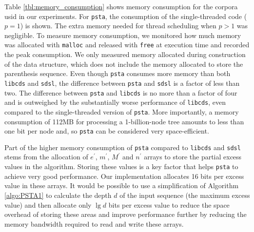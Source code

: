 Table \ref{tbl:memory_consumption} shows memory consumption for the
corpora usid in our experiments.
For {\tt psta}, the consumption of the single-threaded code ($p = 1$)
is shown.
The extra memory needed for thread scheduling when $p > 1$ was negligible.
To measure memory consumption, we
monitored how much memory was allocated with \texttt{malloc} and
released with \texttt{free} at execution time and recorded the peak
consumption.
We only measured memory allocated during construction of the data structure,
which does not include  the memory allocated to store the parenthesis sequence.
Even though {\tt psta} consumes more memory than both {\tt libcds} and
{\tt sdsl}, the difference between {\tt psta} and {\tt sdsl} is a factor of
less than two.
The difference between {\tt psta} and {\tt libcds} is no more than a factor of
four and is outweighed by the substantially worse performance of {\tt libcds},
even compared to the single-threaded version of {\tt psta}.
More importantly, a memory consumption of 112MB for processing a 1-billion-node
tree amounts to less than one bit per node and, so {\tt psta} can be considered
very space-efficient.


Part of the higher memory consumption of {\tt psta} compared to {\tt libcds}
and {\tt sdsl} stems from the allocation of
$e^{\prime}$, $m^{\prime}$, $M^{\prime}$ and $n^{\prime}$ arrays to store the
partial excess values in the algorithm.
Storing these values is a key factor that helps {\tt psta} to achieve very
good performance.
Our implementation allocates 16 bits per excess value in these arrays.
It would be possible to use a simplification
of Algorithm \ref{algo:PSTA1} to calculate the depth $d$ of the input
sequence (the maximum excess value) and then allocate only $\lg d$ bits per
excess value to reduce the space overhead of storing these areas and improve
performance further by reducing the memory bandwidth required to read and write
these arrays.

